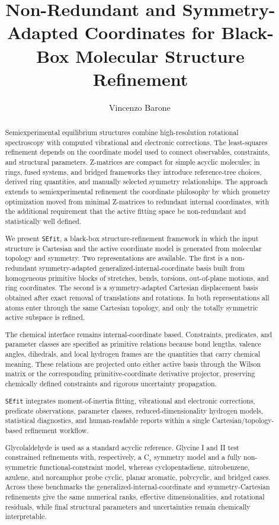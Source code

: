 \documentclass[journal=jctcce,manuscript=article,maxauthors=999]{achemso}
\title{Non-Redundant and Symmetry-Adapted Coordinates for Black-Box Molecular Structure Refinement}
\author{Vincenzo Barone\,\orcidlink{0000-0001-6420-4107}}
\affiliation{INSTM, National Interuniversity Consortium for Materials Science and Technology, via G. Giusti 9, 50121 Firenze, Italy}
\begin{document}
\begin{abstract}

Semiexperimental equilibrium structures combine high-resolution rotational
spectroscopy with computed vibrational and electronic corrections. The
least-squares refinement depends on the coordinate model used to connect
observables, constraints, and structural parameters. Z-matrices are compact for
simple acyclic molecules; in rings, fused systems, and bridged frameworks they
introduce reference-tree choices, derived ring quantities, and manually selected
symmetry relationships.
The approach extends to semiexperimental refinement the coordinate philosophy
by which geometry optimization moved from minimal Z-matrices to redundant
internal coordinates, with the additional requirement that the active fitting
space be non-redundant and statistically well defined.

We present \texttt{SEfit}, a black-box structure-refinement framework in which
the input structure is Cartesian and the active coordinate model is generated
from molecular topology and symmetry. Two representations are available. The
first is a non-redundant symmetry-adapted generalized-internal-coordinate basis
built from homogeneous primitive blocks of stretches, bends, torsions,
out-of-plane motions, and ring coordinates. The second is a symmetry-adapted
Cartesian displacement basis obtained after exact removal of translations and
rotations. In both representations all atoms enter through the same Cartesian
topology, and only the totally symmetric active subspace is refined.

The chemical interface remains internal-coordinate based. Constraints,
predicates, and parameter classes are specified as primitive relations because
bond lengths, valence angles, dihedrals, and local hydrogen frames are the
quantities that carry chemical meaning. These relations are projected onto
either active basis through the Wilson matrix or the corresponding
primitive-coordinate derivative projector, preserving chemically defined
constraints and rigorous uncertainty propagation.

\texttt{SEfit} integrates moment-of-inertia fitting, vibrational and electronic
corrections, predicate observations, parameter classes, reduced-dimensionality
hydrogen models, statistical diagnostics, and human-readable reports within a
single Cartesian/topology-based refinement workflow.

Glycolaldehyde is used as a standard acyclic reference. Glycine I and II test
constrained refinements with, respectively, a C$_s$ symmetry model and a
fully non-symmetric functional-constraint model, whereas cyclopentadiene,
nitrobenzene, azulene, and norcamphor probe cyclic, planar aromatic,
polycyclic, and bridged cases. Across these benchmarks the
generalized-internal-coordinate and symmetry-Cartesian refinements give the
same numerical ranks, effective dimensionalities, and rotational residuals,
while final structural parameters and uncertainties remain chemically
interpretable.

\end{abstract}
\end{document}
